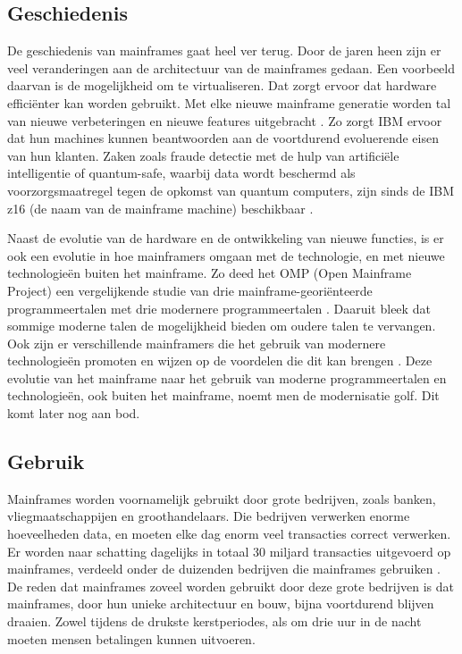 \subsection{Geschiedenis}
De geschiedenis van mainframes gaat heel ver terug. Door de jaren heen zijn er veel veranderingen aan de architectuur van de mainframes gedaan. Een voorbeeld daarvan is de mogelijkheid om te virtualiseren. Dat zorgt ervoor dat hardware efficiënter kan worden gebruikt. Met elke nieuwe mainframe generatie worden tal van nieuwe verbeteringen en nieuwe features uitgebracht \autocite{Jacobi2020}. Zo zorgt IBM ervoor dat hun machines kunnen beantwoorden aan de voortdurend evoluerende eisen van hun klanten. Zaken zoals fraude detectie met de hulp van artificiële intelligentie of quantum-safe, waarbij data wordt beschermd als voorzorgsmaatregel tegen de opkomst van quantum computers, zijn sinds de IBM z16 (de naam van de mainframe machine) beschikbaar \autocite{Stine2022,NgoYe2018}.

Naast de evolutie van de hardware en de ontwikkeling van nieuwe functies, is er ook een evolutie in hoe mainframers omgaan met de technologie, en met nieuwe technologieën buiten het mainframe. Zo deed het OMP (Open Mainframe Project) een vergelijkende studie van drie mainframe-georiënteerde programmeertalen met drie modernere programmeertalen \autocites{OMPMWG2024}. Daaruit bleek dat sommige moderne talen de mogelijkheid bieden om oudere talen te vervangen. Ook zijn er verschillende mainframers die het gebruik van modernere technologieën promoten en wijzen op de voordelen die dit kan brengen \autocites{Gilio2021}. Deze evolutie van het mainframe naar het gebruik van moderne programmeertalen en technologieën, ook buiten het mainframe, noemt men de modernisatie golf. Dit komt later nog aan bod.

\subsection{Gebruik}
Mainframes worden voornamelijk gebruikt door grote bedrijven, zoals banken, vliegmaatschappijen en groothandelaars. Die bedrijven verwerken enorme hoeveelheden data, en moeten elke dag enorm veel transacties correct verwerken. Er worden naar schatting dagelijks in totaal 30 miljard transacties uitgevoerd op mainframes, verdeeld onder de duizenden bedrijven die mainframes gebruiken \autocites{NgoYe2018}. De reden dat mainframes zoveel worden gebruikt door deze grote bedrijven is dat mainframes, door hun unieke architectuur en bouw, bijna voortdurend blijven draaien. Zowel tijdens de drukste kerstperiodes, als om drie uur in de nacht moeten mensen betalingen kunnen uitvoeren.

